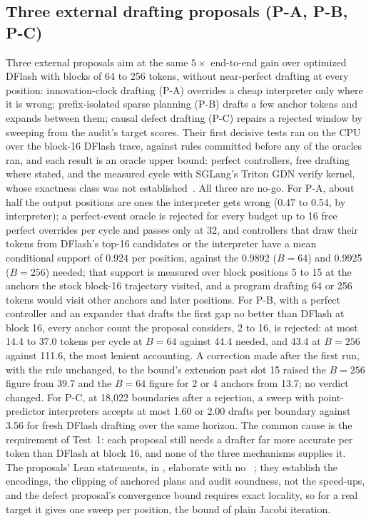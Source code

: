 \subsection{Three external drafting proposals (P-A, P-B, P-C)}\label{app:external-drafting}
Three external proposals aim at the same $5\times$ end-to-end gain over optimized DFlash with blocks of 64 to 256 tokens, without near-perfect drafting at every position: innovation-clock drafting (P-A) overrides a cheap interpreter only where it is wrong; prefix-isolated sparse planning (P-B) drafts a few anchor tokens and expands between them; causal defect drafting (P-C) repairs a rejected window by sweeping from the audit's target scores. Their first decisive tests ran on the CPU over the block-16 DFlash trace, against rules committed before any of the oracles ran, and each result is an oracle upper bound: perfect controllers, free drafting where stated, and the measured cycle with SGLang's Triton GDN verify kernel, whose exactness class was not established~. All three are no-go. For P-A, about half the output positions are ones the interpreter gets wrong (0.47 to 0.54, by interpreter); a perfect-event oracle is rejected for every budget up to 16 free perfect overrides per cycle and passes only at 32, and controllers that draw their tokens from DFlash's top-16 candidates or the interpreter have a mean conditional support of 0.924 per position, against the 0.9892 ($B=64$) and 0.9925 ($B=256$) needed; that support is measured over block positions 5 to 15 at the anchors the stock block-16 trajectory visited, and a program drafting 64 or 256 tokens would visit other anchors and later positions. For P-B, with a perfect controller and an expander that drafts the first gap no better than DFlash at block 16, every anchor count the proposal considers, 2 to 16, is rejected: at most 14.4 to 37.0 tokens per cycle at $B=64$ against 44.4 needed, and 43.4 at $B=256$ against 111.6, the most lenient accounting. A correction made after the first run, with the rule unchanged, to the bound's extension past slot 15 raised the $B=256$ figure from 39.7 and the $B=64$ figure for 2 or 4 anchors from 13.7; no verdict changed. For P-C, at 18,022 boundaries after a rejection, a sweep with point-predictor interpreters accepts at most 1.60 or 2.00 drafts per boundary against 3.56 for fresh DFlash drafting over the same horizon. The common cause is the requirement of Test~1: each proposal still needs a drafter far more accurate per token than DFlash at block 16, and none of the three mechanisms supplies it. The proposals' Lean statements, in , elaborate with no ~; they establish the encodings, the clipping of anchored plans and audit soundness, not the speed-ups, and the defect proposal's convergence bound requires exact locality, so for a real target it gives one sweep per position, the bound of plain Jacobi iteration.

